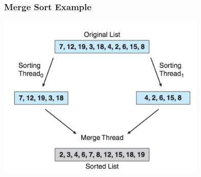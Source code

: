 \begin{frame}
	\frametitle{Merge Sort Example}

	\begin{center}
		\includegraphics[width=0.75\textwidth]{images/multithread-sort.png}
	\end{center}


\end{frame}





